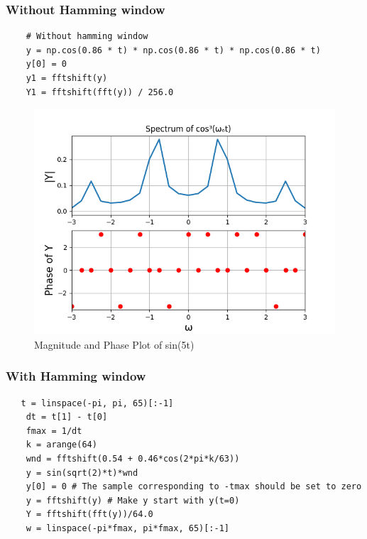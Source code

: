 \documentclass{article}
\begin{document}
\subsubsection{Without Hamming window}
\begin{verbatim}
    # Without hamming window
    y = np.cos(0.86 * t) * np.cos(0.86 * t) * np.cos(0.86 * t)
    y[0] = 0
    y1 = fftshift(y)
    Y1 = fftshift(fft(y)) / 256.0
\end{verbatim}

\begin{figure}[!ht]
  \centering
  \includegraphics[scale=0.6]{Figure_7.png}
  \caption{Magnitude and Phase Plot of sin(5t)}
  \label{fig:sample}
  \end{figure}
  
\subsubsection{With Hamming window}
\begin{verbatim}
   t = linspace(-pi, pi, 65)[:-1]
    dt = t[1] - t[0]
    fmax = 1/dt
    k = arange(64)
    wnd = fftshift(0.54 + 0.46*cos(2*pi*k/63))
    y = sin(sqrt(2)*t)*wnd
    y[0] = 0 # The sample corresponding to -tmax should be set to zero
    y = fftshift(y) # Make y start with y(t=0)
    Y = fftshift(fft(y))/64.0
    w = linspace(-pi*fmax, pi*fmax, 65)[:-1]
    
\end{verbatim}
\end{document}
